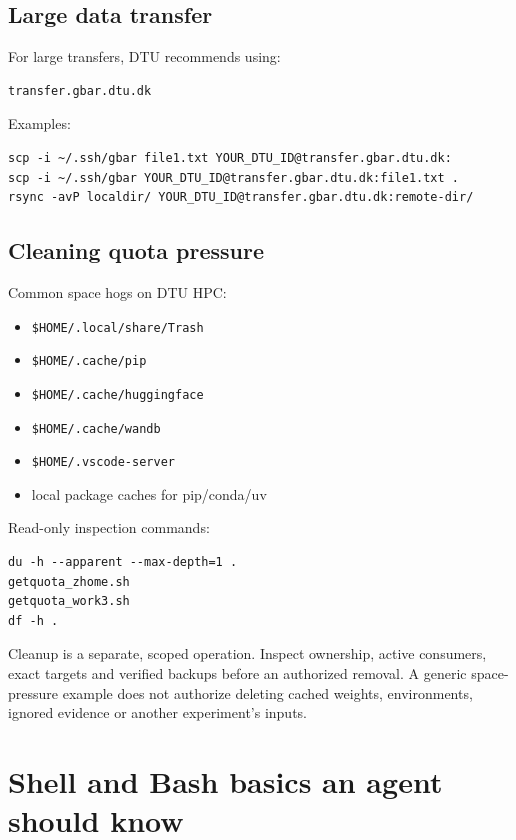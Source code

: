 \documentclass[11pt,a4paper]{article}
\begin{document}
\subsection{Large data transfer}

For large transfers, DTU recommends using:

\begin{lstlisting}[style=shell]
transfer.gbar.dtu.dk
\end{lstlisting}

Examples:

\begin{lstlisting}[style=shell]
scp -i ~/.ssh/gbar file1.txt YOUR_DTU_ID@transfer.gbar.dtu.dk:
scp -i ~/.ssh/gbar YOUR_DTU_ID@transfer.gbar.dtu.dk:file1.txt .
rsync -avP localdir/ YOUR_DTU_ID@transfer.gbar.dtu.dk:remote-dir/
\end{lstlisting}

\subsection{Cleaning quota pressure}

Common space hogs on DTU HPC:

\begin{itemize}[leftmargin=1.5em]
  \item \texttt{\$HOME/.local/share/Trash}
  \item \texttt{\$HOME/.cache/pip}
  \item \texttt{\$HOME/.cache/huggingface}
  \item \texttt{\$HOME/.cache/wandb}
  \item \texttt{\$HOME/.vscode-server}
  \item local package caches for pip/conda/uv
\end{itemize}

Read-only inspection commands:

\begin{lstlisting}[style=shell]
du -h --apparent --max-depth=1 .
getquota_zhome.sh
getquota_work3.sh
df -h .
\end{lstlisting}

Cleanup is a separate, scoped operation. Inspect ownership, active consumers,
exact targets and verified backups before an authorized removal. A generic
space-pressure example does not authorize deleting cached weights, environments,
ignored evidence or another experiment's inputs.

\section{Shell and Bash basics an agent should know}
\end{document}
